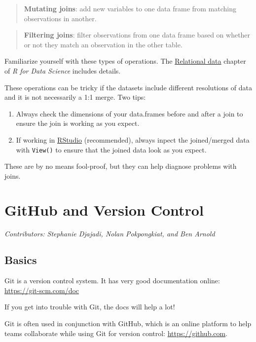 \documentclass[]{book}
\begin{document}
\begin{quote}
\textbf{Mutating joins}: add new variables to one data frame from matching observations in another.
\end{quote}

\begin{quote}
\textbf{Filtering joins}: filter observations from one data frame based on whether or not they match an observation in the other table.
\end{quote}

Familiarize yourself with these types of operations. The \href{https://r4ds.had.co.nz/relational-data.html}{Relational data} chapter of \emph{R for Data Science} includes details.

These operations can be tricky if the datasets include different resolutions of data and it is not necessarily a 1:1 merge. Two tips:

\begin{enumerate}
\def\labelenumi{\arabic{enumi}.}
\item
  Always check the dimensions of your data.frames before and after a join to ensure the join is working as you expect.
\item
  If working in \href{https://rstudio.com/}{RStudio} (recommended), always inpect the joined/merged data with \texttt{View()} to ensure that the joined data look as you expect.
\end{enumerate}

These are by no means fool-proof, but they can help diagnose problems with joins.

\hypertarget{github}{%
\chapter{GitHub and Version Control}\label{github}}

\emph{Contributors: Stephanie Djajadi, Nolan Pokpongkiat, and Ben Arnold}

\hypertarget{basics}{%
\section{Basics}\label{basics}}

Git is a version control system. It has very good documentation online: \url{https://git-scm.com/doc}

If you get into trouble with Git, the docs will help a lot!

Git is often used in conjunction with GitHub, which is an online platform to help teams collaborate while using Git for version control: \url{https://github.com}.
\end{document}
